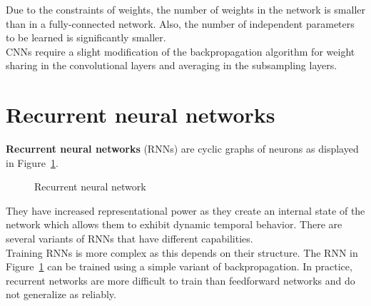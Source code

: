 \documentclass{report}
\begin{document}
Due to the constraints of weights, the number of weights in the network is smaller than in a fully-connected network.
Also, the number of independent parameters to be learned is significantly smaller. \\
CNNs require a slight modification of the backpropagation algorithm for weight sharing in the convolutional layers and averaging in the subsampling layers.

\section{Recurrent neural networks}
{\bf Recurrent neural networks} (RNNs) are cyclic graphs of neurons as displayed in Figure~\ref{figure:recurrentneuralnetwork}.

\begin{figure}[h!]
\centering
{}
\caption{Recurrent neural network}
\label{figure:recurrentneuralnetwork}
\end{figure}

They have increased representational power as they create an internal state of the network which allows them to exhibit dynamic temporal behavior. There are several variants of RNNs that have different capabilities.
\\
Training RNNs is more complex as this depends on their structure. The RNN in Figure~\ref{figure:recurrentneuralnetwork} can be trained using a simple variant of backpropagation.
In practice, recurrent networks are more difficult to train than feedforward networks and do not generalize as reliably.
\end{document}
